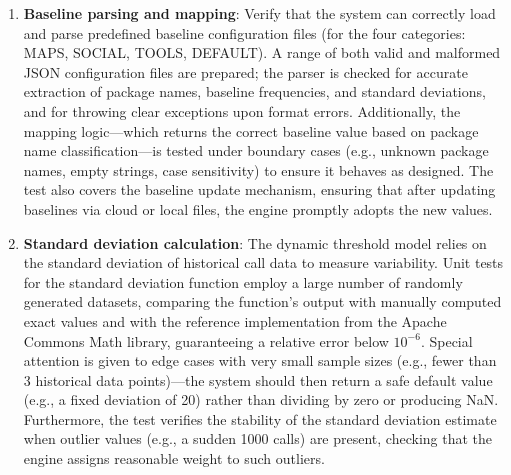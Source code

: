 \begin{enumerate}
\item \textbf{Baseline parsing and mapping}: Verify that the system can correctly load and parse predefined baseline configuration files (for the four categories: MAPS, SOCIAL, TOOLS, DEFAULT). A range of both valid and malformed JSON configuration files are prepared; the parser is checked for accurate extraction of package names, baseline frequencies, and standard deviations, and for throwing clear exceptions upon format errors. Additionally, the mapping logic—which returns the correct baseline value based on package name classification—is tested under boundary cases (e.g., unknown package names, empty strings, case sensitivity) to ensure it behaves as designed. The test also covers the baseline update mechanism, ensuring that after updating baselines via cloud or local files, the engine promptly adopts the new values.

\item \textbf{Standard deviation calculation}: The dynamic threshold model relies on the standard deviation of historical call data to measure variability. Unit tests for the standard deviation function employ a large number of randomly generated datasets, comparing the function's output with manually computed exact values and with the reference implementation from the Apache Commons Math library, guaranteeing a relative error below $10^{-6}$. Special attention is given to edge cases with very small sample sizes (e.g., fewer than 3 historical data points)—the system should then return a safe default value (e.g., a fixed deviation of 20) rather than dividing by zero or producing NaN. Furthermore, the test verifies the stability of the standard deviation estimate when outlier values (e.g., a sudden 1000 calls) are present, checking that the engine assigns reasonable weight to such outliers.


\end{enumerate}
